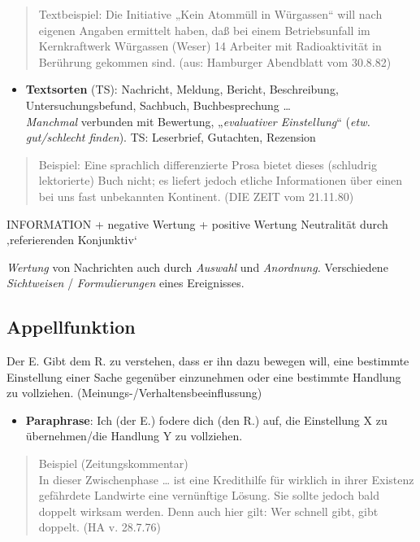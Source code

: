 \documentclass[
  letterpaper,
]{scrbook}
\providecommand{\tightlist}{%
  \setlength{\itemsep}{0pt}\setlength{\parskip}{0pt}}\usepackage{longtable,booktabs,array}
\begin{document}
\begin{quote}
Textbeispiel: Die Initiative „Kein Atommüll in Würgassen`` will nach
eigenen Angaben ermittelt haben, daß bei einem Betriebsunfall im
Kernkraftwerk Würgassen (Weser) 14 Arbeiter mit Radioaktivität in
Berührung gekommen sind. (aus: Hamburger Abendblatt vom 30.8.82)
\end{quote}

\begin{itemize}
\tightlist
\item
  \textbf{Textsorten} (TS): Nachricht, Meldung, Bericht, Beschreibung,
  Untersuchungsbefund, Sachbuch, Buchbesprechung \ldots{}\\
  \emph{Manchmal} verbunden mit Bewertung, „\emph{evaluativer
  Einstellung}`` (\emph{etw. gut/schlecht finden}). TS: Leserbrief,
  Gutachten, Rezension
\end{itemize}

\begin{quote}
Beispiel: Eine sprachlich differenzierte Prosa bietet dieses (schludrig
lektorierte) Buch nicht; es liefert jedoch etliche Informationen über
einen bei uns fast unbekannten Kontinent. (DIE ZEIT vom 21.11.80)
\end{quote}

INFORMATION + negative Wertung + positive Wertung Neutralität durch
‚referierenden Konjunktiv`

\emph{Wertung} von Nachrichten auch durch \emph{Auswahl} und
\emph{Anordnung.} Verschiedene \emph{Sichtweisen} /
\emph{Formulierungen} eines Ereignisses.

\hypertarget{appellfunktion}{%
\subsection{Appellfunktion}\label{appellfunktion}}

Der E. Gibt dem R. zu verstehen, dass er ihn dazu bewegen will, eine
bestimmte Einstellung einer Sache gegenüber einzunehmen oder eine
bestimmte Handlung zu vollziehen. (Meinungs-/Verhaltensbeeinflussung)

\begin{itemize}
\tightlist
\item
  \textbf{Paraphrase}: Ich (der E.) fodere dich (den R.) auf, die
  Einstellung X zu übernehmen/die Handlung Y zu vollziehen.
\end{itemize}

\begin{quote}
Beispiel (Zeitungskommentar)\\
In dieser Zwischenphase \ldots{} ist eine Kredithilfe für wirklich in
ihrer Existenz gefährdete Landwirte eine vernünftige Lösung. Sie sollte
jedoch bald doppelt wirksam werden. Denn auch hier gilt: Wer schnell
gibt, gibt doppelt. (HA v. 28.7.76)
\end{quote}
\end{document}
